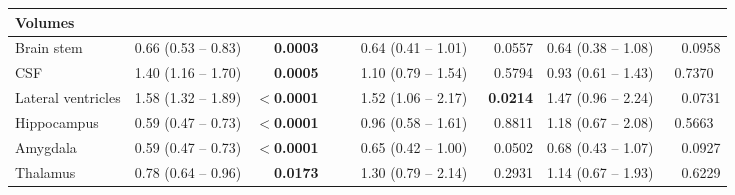 \begin{sidewaystable}
{\begin{tabular}{|l|lr|lr|lr|lr|}
\hline
\multicolumn{1}{|l}{\textbf{Volumes}} &  & \multicolumn{1}{l}{} &  & \multicolumn{1}{l}{} &  & \multicolumn{1}{l}{} &  &  \\ 
\hline
Brain stem & \textcolor[rgb]{0.2,0.2,0.2}{0.66 (0.53 -- 0.83)} & \textcolor[rgb]{0.2,0.2,0.2}{\textbf{0.0003}} & {\cellcolor[rgb]{0.753,0.753,0.753}} & {\cellcolor[rgb]{0.753,0.753,0.753}} & \textcolor[rgb]{0.2,0.2,0.2}{0.64 (0.41 -- 1.01)} & \textcolor[rgb]{0.2,0.2,0.2}{0.0557} & \textcolor[rgb]{0.2,0.2,0.2}{0.64 (0.38 -- 1.08)~} & \textcolor[rgb]{0.2,0.2,0.2}{0.0958} \\ 
\hline
CSF & \textcolor[rgb]{0.2,0.2,0.2}{1.40 (1.16 -- 1.70)} & \textcolor[rgb]{0.2,0.2,0.2}{\textbf{0.0005}} & {\cellcolor[rgb]{0.753,0.753,0.753}} & {\cellcolor[rgb]{0.753,0.753,0.753}} & \textcolor[rgb]{0.2,0.2,0.2}{1.10 (0.79 -- 1.54)} & \textcolor[rgb]{0.2,0.2,0.2}{0.5794} & \textcolor[rgb]{0.2,0.2,0.2}{0.93 (0.61 -- 1.43)~} & \textcolor[rgb]{0.2,0.2,0.2}{0.7370~} \\ 
\hline
Lateral ventricles & \textcolor[rgb]{0.2,0.2,0.2}{1.58 (1.32 -- 1.89)} & \textbf{$<$0.0001} & {\cellcolor[rgb]{0.753,0.753,0.753}} & {\cellcolor[rgb]{0.753,0.753,0.753}} & \textcolor[rgb]{0.2,0.2,0.2}{1.52 (1.06 -- 2.17)~} & \textcolor[rgb]{0.2,0.2,0.2}{\textbf{0.0214}} & \textcolor[rgb]{0.2,0.2,0.2}{1.47 (0.96 -- 2.24)~} & \textcolor[rgb]{0.2,0.2,0.2}{0.0731} \\ 
\hline
Hippocampus & \textcolor[rgb]{0.2,0.2,0.2}{0.59 (0.47 -- 0.73)} & \textbf{$<$0.0001} & {\cellcolor[rgb]{0.753,0.753,0.753}} & {\cellcolor[rgb]{0.753,0.753,0.753}} & \textcolor[rgb]{0.2,0.2,0.2}{0.96 (0.58 -- 1.61)} & \textcolor[rgb]{0.2,0.2,0.2}{0.8811} & \textcolor[rgb]{0.2,0.2,0.2}{1.18 (0.67 -- 2.08)~} & \textcolor[rgb]{0.2,0.2,0.2}{0.5663~} \\ 
\hline
Amygdala & \textcolor[rgb]{0.2,0.2,0.2}{0.59 (0.47 -- 0.73)} & \textbf{$<$0.0001} & {\cellcolor[rgb]{0.753,0.753,0.753}} & {\cellcolor[rgb]{0.753,0.753,0.753}} & \textcolor[rgb]{0.2,0.2,0.2}{0.65 (0.42 -- 1.00)} & \textcolor[rgb]{0.2,0.2,0.2}{0.0502} & \textcolor[rgb]{0.2,0.2,0.2}{0.68 (0.43 -- 1.07)~} & \textcolor[rgb]{0.2,0.2,0.2}{0.0927} \\ 
\hline
Thalamus & \textcolor[rgb]{0.2,0.2,0.2}{0.78 (0.64 -- 0.96)} & \textcolor[rgb]{0.2,0.2,0.2}{\textbf{0.0173}} & {\cellcolor[rgb]{0.753,0.753,0.753}} & {\cellcolor[rgb]{0.753,0.753,0.753}} & \textcolor[rgb]{0.2,0.2,0.2}{1.30 (0.79 -- 2.14)~} & \textcolor[rgb]{0.2,0.2,0.2}{0.2931} & \textcolor[rgb]{0.2,0.2,0.2}{1.14 (0.67 -- 1.93)~} & \textcolor[rgb]{0.2,0.2,0.2}{0.6229} \\ 

\end{tabular}}
\end{sidewaystable}

